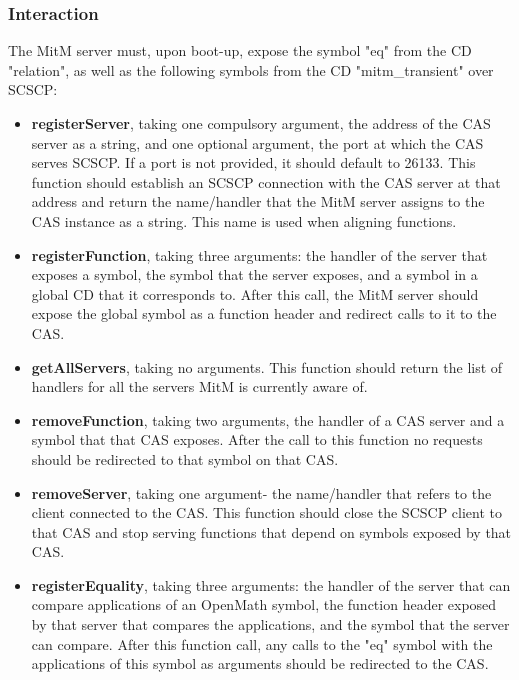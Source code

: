 \subsubsection{Interaction}
The MitM server must, upon boot-up, expose the symbol "eq" from the CD 
"relation", as well as the following symbols from the CD "mitm\_transient"
over SCSCP:
\begin{itemize}
  \item \textbf{registerServer}, taking one compulsory argument, the address of the
    CAS server as a string, and one optional argument, the port at which the CAS
    serves SCSCP. If a port is not provided, it should default to 26133. This
    function should establish an SCSCP connection with the CAS server at that 
    address and return the name/handler that the MitM server assigns to the 
    CAS instance as a string. This name is used when aligning functions.
  \item \textbf{registerFunction}, taking three arguments: the handler of the 
    server that exposes a symbol, the symbol that the server exposes, and
    a symbol in a global CD that it corresponds to. After this call, the MitM
    server should expose the global symbol as a function header and redirect
    calls to it to the CAS.
  \item \textbf{getAllServers}, taking no arguments. This function should return 
    the list of handlers for all the servers MitM is currently aware of.
  \item \textbf{removeFunction}, taking two arguments, the handler of a CAS server 
    and a symbol that that CAS exposes. After the call to this function no 
    requests should be redirected to that symbol on that CAS.
  \item \textbf{removeServer}, taking one argument- the name/handler that refers
    to the client connected to the CAS. This function should close the SCSCP client
    to that CAS and stop serving functions that depend on symbols exposed by
    that CAS.
  \item \textbf{registerEquality}, taking three arguments: the handler of the 
    server that can compare applications of an OpenMath symbol, the function
    header exposed by that server that compares the applications, and the symbol
    that the server can compare. After this function call, any calls to the "eq"
    symbol with the applications of this symbol as arguments should be redirected
    to the CAS.
\end{itemize}

